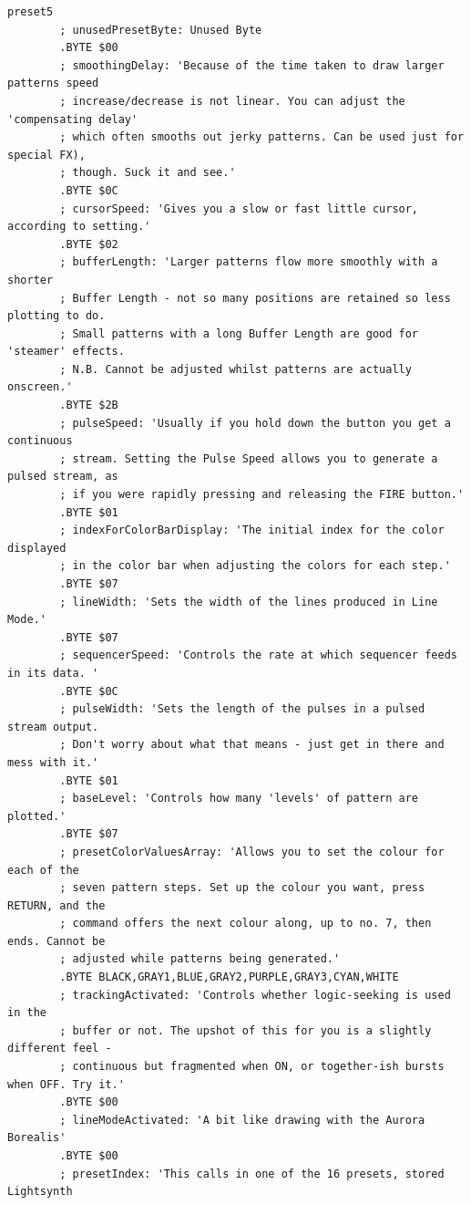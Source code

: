 \begin{lstlisting}[basicstyle=\tiny,caption=Source code for Preset 5.]
preset5
        ; unusedPresetByte: Unused Byte
        .BYTE $00
        ; smoothingDelay: 'Because of the time taken to draw larger patterns speed
        ; increase/decrease is not linear. You can adjust the 'compensating delay'
        ; which often smooths out jerky patterns. Can be used just for special FX),
        ; though. Suck it and see.'
        .BYTE $0C
        ; cursorSpeed: 'Gives you a slow or fast little cursor, according to setting.'
        .BYTE $02
        ; bufferLength: 'Larger patterns flow more smoothly with a shorter
        ; Buffer Length - not so many positions are retained so less plotting to do.
        ; Small patterns with a long Buffer Length are good for 'steamer' effects.
        ; N.B. Cannot be adjusted whilst patterns are actually onscreen.'
        .BYTE $2B
        ; pulseSpeed: 'Usually if you hold down the button you get a continuous
        ; stream. Setting the Pulse Speed allows you to generate a pulsed stream, as
        ; if you were rapidly pressing and releasing the FIRE button.'
        .BYTE $01
        ; indexForColorBarDisplay: 'The initial index for the color displayed
        ; in the color bar when adjusting the colors for each step.'
        .BYTE $07
        ; lineWidth: 'Sets the width of the lines produced in Line Mode.'
        .BYTE $07
        ; sequencerSpeed: 'Controls the rate at which sequencer feeds in its data. '
        .BYTE $0C
        ; pulseWidth: 'Sets the length of the pulses in a pulsed stream output.
        ; Don't worry about what that means - just get in there and mess with it.'
        .BYTE $01
        ; baseLevel: 'Controls how many 'levels' of pattern are plotted.'
        .BYTE $07
        ; presetColorValuesArray: 'Allows you to set the colour for each of the
        ; seven pattern steps. Set up the colour you want, press RETURN, and the
        ; command offers the next colour along, up to no. 7, then ends. Cannot be
        ; adjusted while patterns being generated.'
        .BYTE BLACK,GRAY1,BLUE,GRAY2,PURPLE,GRAY3,CYAN,WHITE
        ; trackingActivated: 'Controls whether logic-seeking is used in the
        ; buffer or not. The upshot of this for you is a slightly different feel -
        ; continuous but fragmented when ON, or together-ish bursts when OFF. Try it.'
        .BYTE $00
        ; lineModeActivated: 'A bit like drawing with the Aurora Borealis'
        .BYTE $00
        ; presetIndex: 'This calls in one of the 16 presets, stored Lightsynth

\end{lstlisting}
